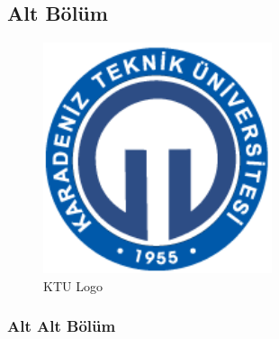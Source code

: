 \subsection{Alt Bölüm}
\begin{figure}[!h]
  \centering
  \begin{measuredfigure} %
  \includegraphics[width=0.6\textwidth]{Figures/ktuLogo}
  \caption{KTU Logo }
  \label{fig:wordvslatex}
  \end{measuredfigure}
\end{figure}

\subsubsection{\hspace{1cm}Alt Alt Bölüm}